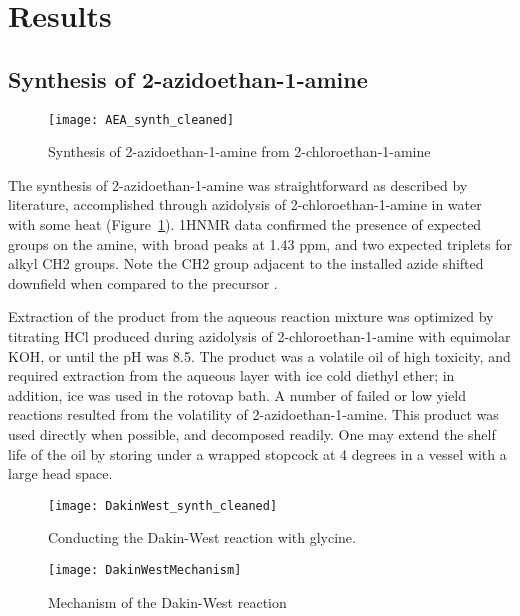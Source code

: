 \section{Results}

\subsection{Synthesis of 2-azidoethan-1-amine}

\begin{figure}
\texttt{[image: AEA\_synth\_cleaned]}
\caption{Synthesis of 2-azidoethan-1-amine from 2-chloroethan-1-amine}
\label{fig:AEA}
\end{figure}

The synthesis of 2-azidoethan-1-amine was straightforward as described by literature, accomplished through azidolysis of 2-chloroethan-1-amine in water with some heat (Figure~\ref{fig:AEA}). 1HNMR data confirmed the presence of expected groups on the amine, with broad peaks at 1.43 ppm, and two expected triplets for alkyl CH2 groups. Note the CH2 group adjacent to the installed azide shifted downfield when compared to the precursor \cite{AEABenalil}.


Extraction of the product from the aqueous reaction mixture was optimized by titrating HCl produced during azidolysis of 2-chloroethan-1-amine with equimolar KOH, or until the pH was 8.5. The product was a volatile oil of high toxicity, and required extraction from the aqueous layer with ice cold diethyl ether; in addition, ice was used in the rotovap bath. A number of failed or low yield reactions resulted from the volatility of 2-azidoethan-1-amine. This product was used directly when possible, and decomposed readily. One may extend the shelf life of the oil by storing under a wrapped stopcock at 4 degrees in a vessel with a large head space. 

\begin{figure}
\texttt{[image: DakinWest\_synth\_cleaned]}
\caption{Conducting the Dakin-West reaction with glycine.}
\label{fig:DakinWest}
\end{figure}



\begin{figure}
\centering
\texttt{[image: DakinWestMechanism]}
\caption{Mechanism of the Dakin-West reaction}
\label{fig:DakinWestMechanism}
\end{figure}

